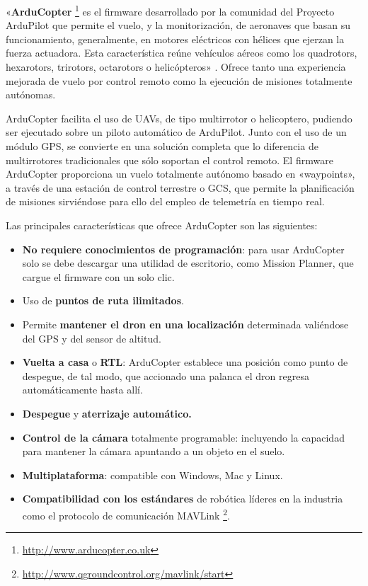 «\textbf{ArduCopter} \footnote{\url{http://www.arducopter.co.uk}} es el firmware desarrollado por la comunidad del Proyecto ArduPilot que permite el vuelo, y la monitorización, de aeronaves que basan su funcionamiento, generalmente, en motores eléctricos con hélices  que  ejerzan  la  fuerza  actuadora.  Esta característica  reúne  vehículos  aéreos  como  los  quadrotors, hexarotors, trirotors, octarotors o helicópteros» \cite{arducopter}. Ofrece tanto una experiencia mejorada de vuelo por control remoto como la ejecución de misiones totalmente autónomas.

ArduCopter facilita el uso de \acs{UAV}s, de tipo multirrotor o helicoptero, pudiendo ser ejecutado sobre un piloto automático de ArduPilot.
Junto con el uso de un módulo \acs{GPS}, se convierte en una solución completa que lo diferencia de multirrotores tradicionales que sólo 
soportan el control remoto. El firmware ArduCopter proporciona un vuelo totalmente autónomo basado en «waypoints», a través de 
una estación de control terrestre o \acs{GCS}, que permite la planificación de misiones sirviéndose para ello del empleo de telemetría en tiempo real.

Las principales características que ofrece ArduCopter son las siguientes:
\begin{itemize}
\item \textbf{No requiere conocimientos de programación}: para usar ArduCopter solo se debe descargar una utilidad de escritorio, como 
Mission Planner, que cargue el firmware con un solo clic.
\item Uso de \textbf{puntos de ruta ilimitados}.
\item Permite \textbf{mantener el dron en una localización} determinada valiéndose del \acs{GPS} y del sensor de altitud.
\item \textbf{Vuelta a casa} o \textbf{\acs{RTL}}: ArduCopter establece una posición como punto de despegue, de tal modo, que accionado una palanca el dron regresa automáticamente hasta allí.
\item \textbf{Despegue} y \textbf{aterrizaje automático.}
\item \textbf{Control de la cámara} totalmente programable: incluyendo la capacidad para mantener la cámara apuntando a un objeto en el suelo.
\item \textbf{Multiplataforma}: compatible con Windows, Mac y Linux.
\item \textbf{Compatibilidad con los estándares} de robótica líderes en la industria como el protocolo de comunicación MAVLink \footnote{\url{http://www.qgroundcontrol.org/mavlink/start}}.
\end{itemize}

